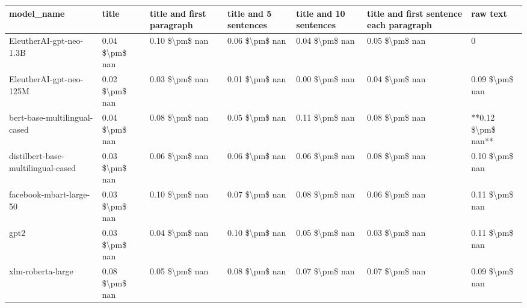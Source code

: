 \begin{tabular}{lllllll}
\toprule
                        model\_name &          title & title and first paragraph & title and 5 sentences & title and 10 sentences & title and first sentence each paragraph &           raw text \\
\midrule
           EleutherAI-gpt-neo-1.3B & 0.04 \$\textbackslash pm\$ nan &            0.10 \$\textbackslash pm\$ nan &        0.06 \$\textbackslash pm\$ nan &         0.04 \$\textbackslash pm\$ nan &                          0.05 \$\textbackslash pm\$ nan &                  0 \\
           EleutherAI-gpt-neo-125M & 0.02 \$\textbackslash pm\$ nan &            0.03 \$\textbackslash pm\$ nan &        0.01 \$\textbackslash pm\$ nan &         0.00 \$\textbackslash pm\$ nan &                          0.04 \$\textbackslash pm\$ nan &     0.09 \$\textbackslash pm\$ nan \\
      bert-base-multilingual-cased & 0.04 \$\textbackslash pm\$ nan &            0.08 \$\textbackslash pm\$ nan &        0.05 \$\textbackslash pm\$ nan &         0.11 \$\textbackslash pm\$ nan &                          0.08 \$\textbackslash pm\$ nan & **0.12 \$\textbackslash pm\$ nan** \\
distilbert-base-multilingual-cased & 0.03 \$\textbackslash pm\$ nan &            0.06 \$\textbackslash pm\$ nan &        0.06 \$\textbackslash pm\$ nan &         0.06 \$\textbackslash pm\$ nan &                          0.08 \$\textbackslash pm\$ nan &     0.10 \$\textbackslash pm\$ nan \\
           facebook-mbart-large-50 & 0.03 \$\textbackslash pm\$ nan &            0.10 \$\textbackslash pm\$ nan &        0.07 \$\textbackslash pm\$ nan &         0.08 \$\textbackslash pm\$ nan &                          0.06 \$\textbackslash pm\$ nan &     0.11 \$\textbackslash pm\$ nan \\
                              gpt2 & 0.03 \$\textbackslash pm\$ nan &            0.04 \$\textbackslash pm\$ nan &        0.10 \$\textbackslash pm\$ nan &         0.05 \$\textbackslash pm\$ nan &                          0.03 \$\textbackslash pm\$ nan &     0.11 \$\textbackslash pm\$ nan \\
                 xlm-roberta-large & 0.08 \$\textbackslash pm\$ nan &            0.05 \$\textbackslash pm\$ nan &        0.08 \$\textbackslash pm\$ nan &         0.07 \$\textbackslash pm\$ nan &                          0.07 \$\textbackslash pm\$ nan &     0.09 \$\textbackslash pm\$ nan \\
\bottomrule
\end{tabular}

